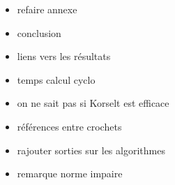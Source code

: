\begin{itemize}
	\item refaire annexe
	\item conclusion
	\item liens vers les résultats
	\item temps calcul cyclo
	\item on ne sait pas si Korselt est efficace
	\item références entre crochets
	\item rajouter sorties sur les algorithmes
	\item remarque norme impaire
\end{itemize}
